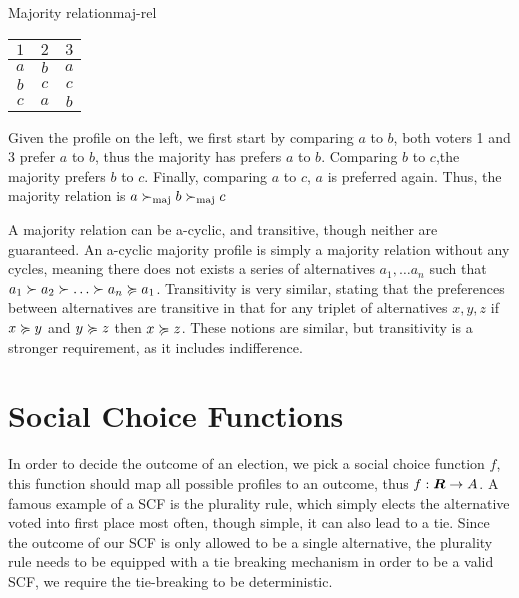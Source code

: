\begin{example}{Majority relation}{maj-rel}
	\begin{minipage}{0.15\linewidth}
		\begin{tabular}{ccc}
			\toprule
			$1$ & $2$ & $3$ \\
			\midrule
			$a$ & $b$ & $a$ \\
			$b$ & $c$ & $c$ \\
			$c$ & $a$ & $b$ \\
			\bottomrule
		\end{tabular}
	\end{minipage}
	\hspace{0.02\linewidth}
	\begin{minipage}{0.78\linewidth}
		Given the profile on the left, we first start by comparing $a$ to $b$, both voters 1 and 3 prefer $a$ to $b$, thus the majority has prefers $a$ to $b$. Comparing $b$ to $c$,the majority prefers $b$ to $c$. Finally, comparing $a$ to $c$, $a$ is preferred again. Thus, the majority relation is $a \succ_{\textnormal{maj}} b \succ_{\textnormal{maj}} c$
	\end{minipage}
\end{example}

A majority relation can be a-cyclic, and transitive, though neither are guaranteed. An a-cyclic majority profile is simply a majority relation without any cycles, meaning there does not exists a series of alternatives $a_1, \dots a_n$ such that $a_1 \pref a_2 \pref \dots \pref a_n  \prefeq a_1$. Transitivity is very similar, stating that the preferences between alternatives are transitive in that for any triplet of alternatives $x,y,z$ if $x \succcurlyeq y$ and $y \succcurlyeq z$ then $x \succcurlyeq z$. These notions are similar, but transitivity is a stronger requirement, as it includes indifference.


\section{Social Choice Functions}
\label{sec:SCF}
In order to decide the outcome of an election, we pick a social choice function $f$, this function should map all possible profiles to an outcome, thus $f: \boldsymbol{R} \to A$. A famous example of a SCF is the plurality rule, which simply elects the alternative voted into first place most often, though simple, it can also lead to a tie. Since the outcome of our SCF is only allowed to be a single alternative, the plurality rule needs to be equipped with a tie breaking mechanism in order to be a valid SCF, we require the tie-breaking to be deterministic.


